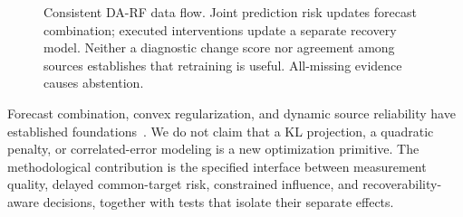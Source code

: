 \begin{figure}[htbp]
\centering
\small
{}
\caption{Consistent DA-RF data flow. Joint prediction risk updates forecast
combination; executed interventions update a separate recovery model.
Neither a diagnostic change score nor agreement among sources establishes
that retraining is useful. All-missing evidence causes abstention.}
\label{fig:framework}
\end{figure}

Forecast combination, convex regularization, and dynamic source reliability
have established foundations~\cite{bates1969,bregman1967,boyd2004,diebold2019,
qmf2023,pdf2024,huang2025}. We do not claim that a KL projection, a quadratic
penalty, or correlated-error modeling is a new optimization primitive.
The methodological contribution is the specified interface between measurement
quality, delayed common-target risk, constrained influence, and recoverability-
aware decisions, together with tests that isolate their separate effects.

